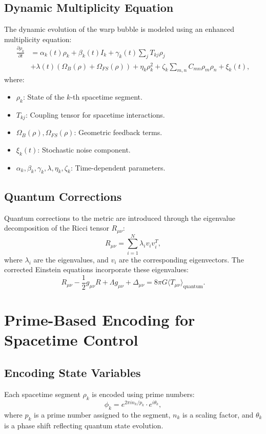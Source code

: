 \documentclass{article}
\theoremstyle{plain}
\begin{document}
\subsection{Dynamic Multiplicity Equation}
The dynamic evolution of the warp bubble is modeled using an enhanced multiplicity equation:
\begin{align}
    \frac{\partial \rho_k}{\partial t} &= \alpha_k(t)\rho_k + \beta_k(t)I_k + \gamma_k(t)\sum_j T_{kj}\rho_j \\
    &+ \lambda(t)\left(\Omega_B(\rho) + \Omega_{FS}(\rho)\right) + \eta_k \rho_k^2 + \zeta_k \sum_{m,n} C_{mn}\rho_m\rho_n + \xi_k(t),
\end{align}
where:
\begin{itemize}
    \item $\rho_k$: State of the $k$-th spacetime segment.
    \item $T_{kj}$: Coupling tensor for spacetime interactions.
    \item $\Omega_B(\rho), \Omega_{FS}(\rho)$: Geometric feedback terms.
    \item $\xi_k(t)$: Stochastic noise component.
    \item $\alpha_k, \beta_k, \gamma_k, \lambda, \eta_k, \zeta_k$: Time-dependent parameters.
\end{itemize}

\subsection{Quantum Corrections}
Quantum corrections to the metric are introduced through the eigenvalue decomposition of the Ricci tensor $R_{\mu\nu}$:
\begin{equation}
    R_{\mu\nu} = \sum_{i=1}^N \lambda_i v_i v_i^T,
\end{equation}
where $\lambda_i$ are the eigenvalues, and $v_i$ are the corresponding eigenvectors. The corrected Einstein equations incorporate these eigenvalues:
\begin{equation}
    R_{\mu\nu} - \frac{1}{2}g_{\mu\nu}R + \Lambda g_{\mu\nu} + \Delta_{\mu\nu} = 8\pi G \langle T_{\mu\nu} \rangle_{\text{quantum}}.
\end{equation}

\section{Prime-Based Encoding for Spacetime Control}

\subsection{Encoding State Variables}
Each spacetime segment $\rho_k$ is encoded using prime numbers:
\begin{equation}
    \phi_k = e^{2\pi i n_k/p_k} \cdot e^{i\theta_k},
\end{equation}
where $p_k$ is a prime number assigned to the segment, $n_k$ is a scaling factor, and $\theta_k$ is a phase shift reflecting quantum state evolution.
\end{document}
